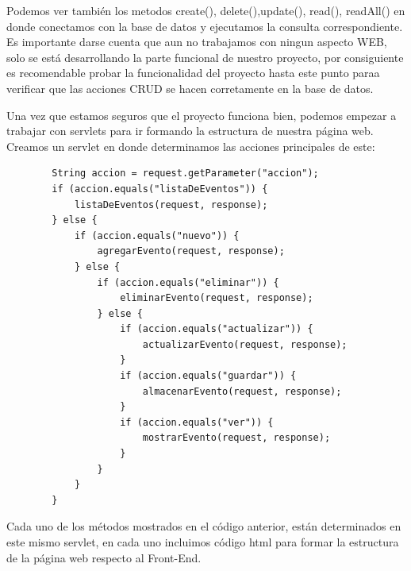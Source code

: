\documentclass[10pt,a4paper]{article}
\begin{document}
    Podemos ver también los metodos create(), delete(),update(), read(), readAll() en donde conectamos con la base de datos y ejecutamos la consulta correspondiente.
    Es importante darse cuenta que aun no trabajamos con ningun aspecto WEB, solo se está desarrollando la parte funcional de nuestro proyecto, por consiguiente es recomendable probar la funcionalidad del proyecto hasta este punto paraa verificar que las acciones CRUD se hacen corretamente en la base de datos.
    
   \subection{\color{colorIPN}{Servlet}} Una vez que estamos seguros que el proyecto funciona bien, podemos empezar a trabajar con servlets para ir formando la estructura de nuestra página web.
    Creamos un servlet en donde determinamos las acciones principales de este:
    \begin{lstlisting}
        String accion = request.getParameter("accion");
        if (accion.equals("listaDeEventos")) {
            listaDeEventos(request, response);
        } else {
            if (accion.equals("nuevo")) {
                agregarEvento(request, response);
            } else {
                if (accion.equals("eliminar")) {
                    eliminarEvento(request, response);
                } else {
                    if (accion.equals("actualizar")) {
                        actualizarEvento(request, response);
                    }
                    if (accion.equals("guardar")) {
                        almacenarEvento(request, response);
                    }
                    if (accion.equals("ver")) {
                        mostrarEvento(request, response);
                    }
                }
            }
        }
    \end{lstlisting}
    Cada uno de los métodos mostrados en el código anterior, están determinados en este mismo servlet, en cada uno incluimos código html para formar la estructura de la página web respecto al Front-End.
\end{document}
